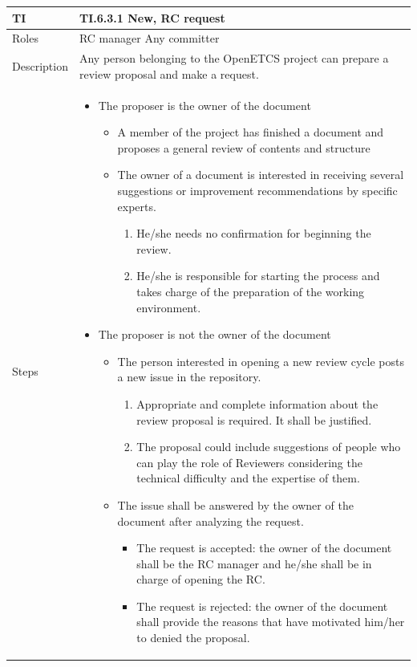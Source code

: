 \documentclass{template/openetcs_article}
\begin{document}
\begin{flushleft}
\tablefirsthead{}
\tablehead{}
\tabletail{}
\tablelasttail{}
\begin{supertabular}{|m{2cm}|m{13cm}|}
\hline
{}
TI & 
TI.6.3.1 New, RC request
\\\hline
Roles &
RC manager
Any committer
\\\hline
Description &
Any person belonging to the OpenETCS project can prepare a review proposal and make a request. 
\\\hline
Steps &
\begin{itemize}
\item The proposer is the owner of the document
\begin{itemize}
\item A member of the project has finished a document and proposes a general review of contents and structure
\item The owner of a document is interested in receiving several suggestions or improvement recommendations by specific experts. 
\begin{enumerate}
\item He/she needs no confirmation for beginning the review. 
\item He/she is responsible for starting the process and takes charge of the preparation of the working environment. 
\end{enumerate}
\end{itemize}
\item The proposer is not the owner of the document
\begin{itemize}
\item The person interested in opening a new review cycle posts a new issue in the repository. 
\begin{enumerate}
\item Appropriate and complete information about the review proposal is required. It shall be justified.
\item The proposal could include suggestions of people who can play the role of Reviewers considering the technical difficulty and the expertise of them.
\end{enumerate}
\item The issue shall be answered by the owner of the document after analyzing the request. 
\begin{itemize}
\item The request is accepted: the owner of the document shall be the RC manager and he/she shall be in charge of opening the RC.
\item The request is rejected: the owner of the document shall provide the reasons that have motivated him/her to denied the proposal. 
\end{itemize}
\end{itemize}
\end{itemize}
\\\hline
\end{supertabular}
\end{flushleft}
\end{document}
